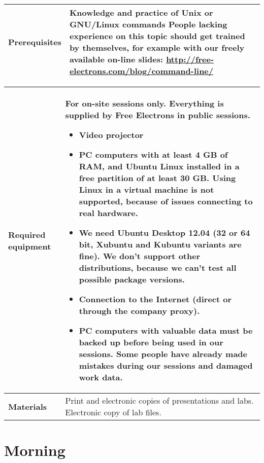 \documentclass[a4paper,12pt,obeyspaces,spaces,hyphens]{article}
\begin{document}
{\begin{tabularx}{\textwidth}{|g|h|}
    {\bf Prerequisites} & {\bf Knowledge and practice of Unix or
      GNU/Linux commands}
    \newline People lacking experience on this topic should get
    trained by themselves, for example with our freely available
    on-line slides:
    \newline \url{http://free-electrons.com/blog/command-line/} \vspace{1em}
     \\
    \hline
  \end{tabularx}

  \begin{tabularx}{\textwidth}{|g|h|}
    {\bf Required equipment} &
    {\bf For on-site sessions only.}
    \newline Everything is supplied by Free Electrons in public sessions.
    \begin{itemize}
    \item Video projector
    \item PC computers with at least 4 GB of RAM, and Ubuntu Linux
    installed in a {\bf free partition of at least 30 GB. Using Linux
      in a virtual machine is not supported}, because of issues
    connecting to real hardware.
    \item We need Ubuntu Desktop 12.04 (32 or 64 bit, Xubuntu and
    Kubuntu variants are fine). We don't support other
    distributions, because we can't test all possible package versions.
    \item {\bf Connection to the Internet} (direct or through the
    company proxy).
    \item {\bf PC computers with valuable data must be backed up}
    before being used in our sessions.  Some people have already made
    mistakes during our sessions and damaged work data.
    \end{itemize}\\
    \hline

    {\bf Materials} & Print and electronic copies of presentations and
    labs.
    \newline Electronic copy of lab files.\\
    \hline

\end{tabularx}}
\normalsize


\section{Morning}
\end{document}
